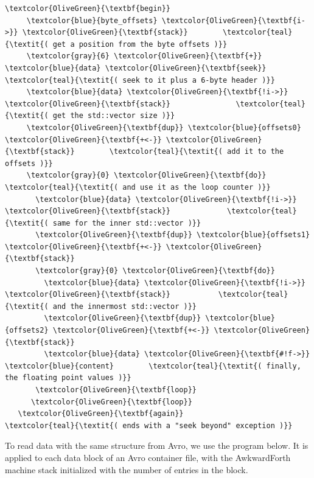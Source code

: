 \documentclass{webofc}
\begin{document}
\begin{Verbatim}[commandchars=\\\{\}]
   \textcolor{OliveGreen}{\textbf{begin}}
     \textcolor{blue}{byte_offsets} \textcolor{OliveGreen}{\textbf{i->}} \textcolor{OliveGreen}{\textbf{stack}}        \textcolor{teal}{\textit{( get a position from the byte offsets )}}
     \textcolor{gray}{6} \textcolor{OliveGreen}{\textbf{+}} \textcolor{blue}{data} \textcolor{OliveGreen}{\textbf{seek}}                 \textcolor{teal}{\textit{( seek to it plus a 6-byte header )}}
     \textcolor{blue}{data} \textcolor{OliveGreen}{\textbf{!i->}} \textcolor{OliveGreen}{\textbf{stack}}               \textcolor{teal}{\textit{( get the std::vector size )}}
     \textcolor{OliveGreen}{\textbf{dup}} \textcolor{blue}{offsets0} \textcolor{OliveGreen}{\textbf{+<-}} \textcolor{OliveGreen}{\textbf{stack}}        \textcolor{teal}{\textit{( add it to the offsets )}}
     \textcolor{gray}{0} \textcolor{OliveGreen}{\textbf{do}}                          \textcolor{teal}{\textit{( and use it as the loop counter )}}
       \textcolor{blue}{data} \textcolor{OliveGreen}{\textbf{!i->}} \textcolor{OliveGreen}{\textbf{stack}}             \textcolor{teal}{\textit{( same for the inner std::vector )}}
       \textcolor{OliveGreen}{\textbf{dup}} \textcolor{blue}{offsets1} \textcolor{OliveGreen}{\textbf{+<-}} \textcolor{OliveGreen}{\textbf{stack}}
       \textcolor{gray}{0} \textcolor{OliveGreen}{\textbf{do}}
         \textcolor{blue}{data} \textcolor{OliveGreen}{\textbf{!i->}} \textcolor{OliveGreen}{\textbf{stack}}           \textcolor{teal}{\textit{( and the innermost std::vector )}}
         \textcolor{OliveGreen}{\textbf{dup}} \textcolor{blue}{offsets2} \textcolor{OliveGreen}{\textbf{+<-}} \textcolor{OliveGreen}{\textbf{stack}}
         \textcolor{blue}{data} \textcolor{OliveGreen}{\textbf{#!f->}} \textcolor{blue}{content}        \textcolor{teal}{\textit{( finally, the floating point values )}}
       \textcolor{OliveGreen}{\textbf{loop}}
      \textcolor{OliveGreen}{\textbf{loop}}
   \textcolor{OliveGreen}{\textbf{again}}                           \textcolor{teal}{\textit{( ends with a "seek beyond" exception )}}
\end{Verbatim}
\normalsize

\noindent To read data with the same structure from Avro, we use the program below. It is applied to each data block of an Avro container file, with the AwkwardForth machine stack initialized with the number of entries in the block.
\end{document}
